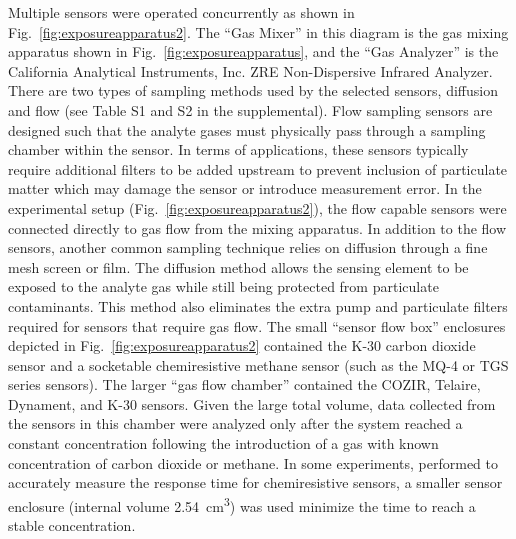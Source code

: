 \documentclass[times]{joehreview}
\begin{document}
	Multiple sensors were operated concurrently as shown in Fig.~\ref{fig:exposureapparatus2}.   The ``Gas Mixer'' in this diagram is the gas mixing apparatus shown in Fig.~\ref{fig:exposureapparatus}, and the ``Gas Analyzer'' is the California Analytical Instruments, Inc. ZRE Non-Dispersive Infrared Analyzer.  There are two types of sampling methods used by the selected sensors, diffusion and flow (see Table S1 and S2 in the supplemental).  Flow sampling sensors are designed such that the analyte gases must physically pass through a sampling chamber within the sensor.  In terms of applications, these sensors typically require additional filters to be added upstream to prevent inclusion of particulate matter which may damage the sensor or introduce measurement error.  In the experimental setup (Fig.~\ref{fig:exposureapparatus2}), the flow capable sensors were connected directly to gas flow from the mixing apparatus.  In addition to the flow sensors, another common sampling technique relies on diffusion through a fine mesh screen or film.  The diffusion method allows the sensing element to be exposed to the analyte gas while still being protected from particulate contaminants.  This method also eliminates the extra pump and particulate filters required for sensors that require gas flow.  The small ``sensor flow box'' enclosures depicted in Fig.~\ref{fig:exposureapparatus2} contained the K-30 carbon dioxide sensor and a socketable chemiresistive methane sensor (such as the MQ-4 or TGS series sensors).  The larger ``gas flow chamber'' contained the COZIR, Telaire, Dynament, and K-30 sensors.  Given the large total volume, data collected from the sensors in this chamber were analyzed only after the system reached a constant concentration following the introduction of a gas with known concentration of carbon dioxide or methane.  In some experiments, performed to accurately measure the response time for chemiresistive sensors, a smaller sensor enclosure (internal volume \SI{2.54}{\centi\meter\cubed}) was used minimize the time to reach a stable concentration.
	
\end{document}
